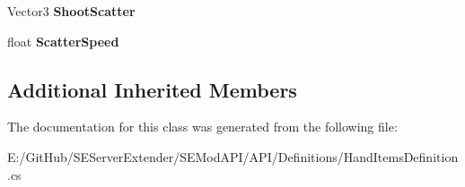 \begin{DoxyCompactItemize}
\item 
\hypertarget{class_s_e_mod_a_p_i_1_1_a_p_i_1_1_definitions_1_1_hand_items_definition_ab831c2d4b9337300560cfb92e96c1818}{}Vector3 {\bfseries Shoot\+Scatter}\label{class_s_e_mod_a_p_i_1_1_a_p_i_1_1_definitions_1_1_hand_items_definition_ab831c2d4b9337300560cfb92e96c1818}

\item 
\hypertarget{class_s_e_mod_a_p_i_1_1_a_p_i_1_1_definitions_1_1_hand_items_definition_ab152babb97c7bac1eb0a0f9b63409193}{}float {\bfseries Scatter\+Speed}\label{class_s_e_mod_a_p_i_1_1_a_p_i_1_1_definitions_1_1_hand_items_definition_ab152babb97c7bac1eb0a0f9b63409193}

\end{DoxyCompactItemize}
\subsection*{Additional Inherited Members}


The documentation for this class was generated from the following file\+:\begin{DoxyCompactItemize}
\item 
E\+:/\+Git\+Hub/\+S\+E\+Server\+Extender/\+S\+E\+Mod\+A\+P\+I/\+A\+P\+I/\+Definitions/Hand\+Items\+Definition.\+cs\end{DoxyCompactItemize}
